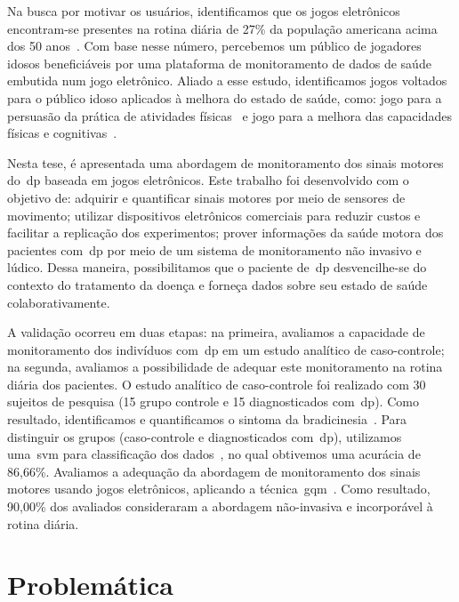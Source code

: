 Na busca por motivar os usuários, identificamos que os jogos eletrônicos encontram-se presentes na rotina diária de 27\% da população americana acima dos 50 anos~\cite{esa2015}. Com base nesse número, percebemos um público de jogadores idosos beneficiáveis por uma plataforma de monitoramento de dados de saúde embutida num jogo eletrônico. Aliado a esse estudo, identificamos jogos voltados para o público idoso aplicados à melhora do estado de saúde, como: jogo para a persuasão da prática de atividades físicas~\cite{brox11} e jogo para a melhora das capacidades físicas e cognitivas~\cite{arntzen2011}. 

Nesta tese, é apresentada uma abordagem de monitoramento dos sinais motores do~\ac{dp} baseada em jogos eletrônicos. Este trabalho foi desenvolvido com o objetivo de: adquirir e quantificar sinais motores por meio de sensores de movimento; utilizar dispositivos eletrônicos comerciais para reduzir custos e facilitar a replicação dos experimentos; prover informações da saúde motora dos pacientes com~\ac{dp} por meio de um sistema de monitoramento não invasivo e lúdico. Dessa maneira, possibilitamos que o paciente de~\ac{dp} desvencilhe-se do contexto do tratamento da doença e forneça dados sobre seu estado de saúde colaborativamente. 

A validação ocorreu em duas etapas: na primeira, avaliamos a capacidade de monitoramento dos indivíduos com~\ac{dp} em um estudo analítico de caso-controle; na segunda, avaliamos a possibilidade de adequar este monitoramento na rotina diária dos pacientes. O estudo analítico de caso-controle foi realizado com 30 sujeitos de pesquisa (15 grupo controle e 15 diagnosticados com~\ac{dp}). Como resultado, identificamos e quantificamos o sintoma da bradicinesia~\cite{protpar010}. Para distinguir os grupos (caso-controle e diagnosticados com~\ac{dp}), utilizamos uma~\ac{svm} para classificação dos dados~\cite{datamining2005}, no qual obtivemos uma acurácia de 86,66\%. Avaliamos a adequação da abordagem de monitoramento dos sinais motores usando jogos eletrônicos, aplicando a técnica~\ac{gqm}~\cite{van1999goal}. Como resultado, 90,00\% dos avaliados consideraram a abordagem não-invasiva e incorporável à rotina diária. 



\section{Problemática}\label{section:problematica}

